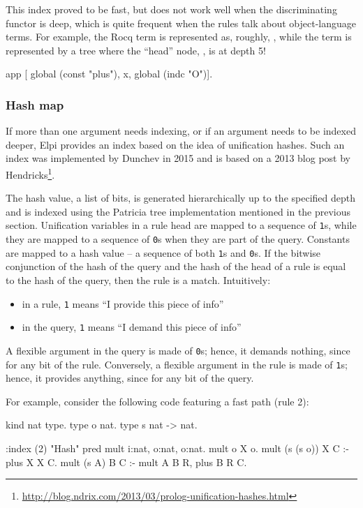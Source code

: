 \documentclass[a4paper, 11pt]{book}
\begin{document}
This index proved to be fast, but does not work well when the discriminating
functor is deep, which is quite frequent when the rules talk about object-language
terms. For example, the Rocq term  is represented as, roughly,
, while the term  is represented by a
tree where the ``head'' node, , is at depth 5!

\begin{elpicode}
  app [ global (const "plus"), x, global (indc "O")].
\end{elpicode}

\subsubsection{Hash map}


If more than one argument needs indexing, or if an argument needs to be
indexed deeper, Elpi provides an index based on the idea of unification
hashes. Such an index was implemented by Dunchev in 2015 and is based on a
2013 blog post by
Hendricks\footnote{\url{http://blog.ndrix.com/2013/03/prolog-unification-hashes.html}}.


The hash value, a list of bits, is generated hierarchically up to the specified
depth and is indexed using the Patricia tree implementation mentioned in the
previous section. Unification variables in a rule head are mapped to a
sequence of \texttt{1}s, while they are mapped to a sequence of \texttt{0}s
when they are part of the query. Constants are mapped to a hash value -- a
sequence of both \texttt{1}s and \texttt{0}s. If the bitwise conjunction
\ocaml{&} of the hash of the query and the hash of the head of a rule is equal
to the hash of the query, then the rule is a match. Intuitively:
\begin{itemize}
  \item in a rule, \texttt{1} means ``I provide this piece of info''
  \item in the query, \texttt{1} means ``I demand this piece of info''
\end{itemize}


\noindent
A flexible argument in the query is made of \texttt{0}s; hence, it demands
nothing, since  for any bit  of the rule.
Conversely, a flexible argument in the rule is made of \texttt{1}s; hence, it
provides anything, since  for any bit  of the query.


For example, consider the following code featuring a fast path (rule 2):
\begin{elpicode}
kind nat type.
type o nat.
type s nat -> nat.

:index (2) "Hash" %
pred mult i:nat, o:nat, o:nat.
mult o X o.                                %
mult (s (s o)) X C :- plus X X C.          %
mult (s A) B C :- mult A B R, plus B R C.  %
\end{elpicode}
\end{document}
